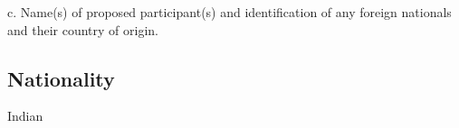 
c. Name(s) of proposed participant(s) and identification of any foreign nationals and their country of origin.
\subsection{Nationality}
Indian
